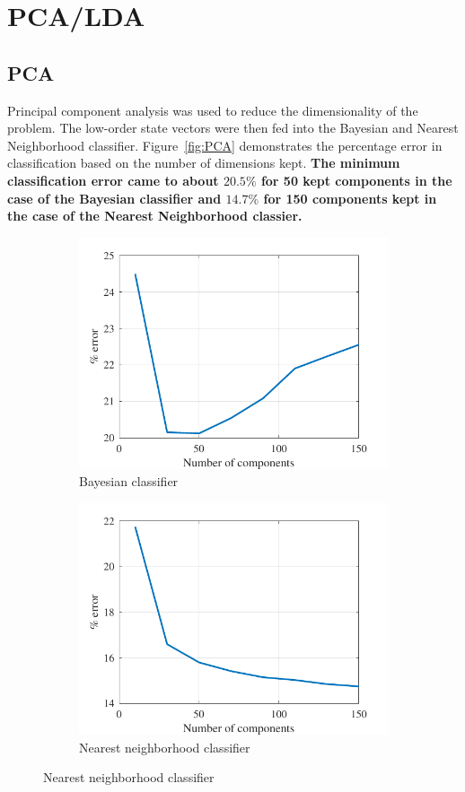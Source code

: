 \documentclass[12pt]{article}
\begin{document}
\section{PCA/LDA}
\subsection{PCA}
Principal component analysis was used to reduce the dimensionality of the problem. The low-order state vectors were then fed into the Bayesian and Nearest Neighborhood classifier. Figure~\ref{fig:PCA} demonstrates the percentage error in classification based on the number of dimensions kept. \textbf{The minimum classification error came to about $ 20.5\%$ for 50 kept components in the case of the Bayesian classifier and $14.7 \%$ for 150 components kept in the case of the Nearest Neighborhood classier.}
 \begin{figure}[h]
 \centering
 \begin{subfigure}[H]{0.49\textwidth}
\centering
  \includegraphics[width=\linewidth]{ML_PCA.pdf}
  \caption{Bayesian classifier}
  
\end{subfigure}
 \begin{subfigure}[H]{0.49\textwidth}
\centering
  \includegraphics[width=\linewidth]{NN_PCA.pdf}
  \caption{Nearest neighborhood classifier}
  

\end{subfigure}
\end{figure}
\end{document}
